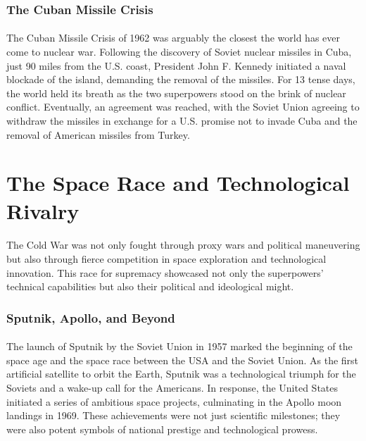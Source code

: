 \documentclass{book}
\begin{document}
\subsubsection*{The Cuban Missile Crisis}
\paragraph{}
The Cuban Missile Crisis of 1962 was arguably the closest the world has ever come to nuclear war. Following the discovery of Soviet nuclear missiles in Cuba, just 90 miles from the U.S. coast, President John F. Kennedy initiated a naval blockade of the island, demanding the removal of the missiles. For 13 tense days, the world held its breath as the two superpowers stood on the brink of nuclear conflict. Eventually, an agreement was reached, with the Soviet Union agreeing to withdraw the missiles in exchange for a U.S. promise not to invade Cuba and the removal of American missiles from Turkey. 

\section*{The Space Race and Technological Rivalry}
\paragraph{}
The Cold War was not only fought through proxy wars and political maneuvering but also through fierce competition in space exploration and technological innovation. This race for supremacy showcased not only the superpowers’ technical capabilities but also their political and ideological might. 

\subsubsection*{Sputnik, Apollo, and Beyond}
\paragraph{}
The launch of Sputnik by the Soviet Union in 1957 marked the beginning of the space age and the space race between the USA and the Soviet Union. As the first artificial satellite to orbit the Earth, Sputnik was a technological triumph for the Soviets and a wake-up call for the Americans. In response, the United States initiated a series of ambitious space projects, culminating in the Apollo moon landings in 1969. These achievements were not just scientific milestones; they were also potent symbols of national prestige and technological prowess. 
\end{document}
